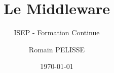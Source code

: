 \documentclass[handout]{beamer}
\title{Le Middleware}
\subtitle{ISEP - Formation Continue}
\author{Romain PELISSE}
\date{\today}
\begin{document}
	\begin{frame}
		\titlepage
	\end{frame}
	
\end{document}
